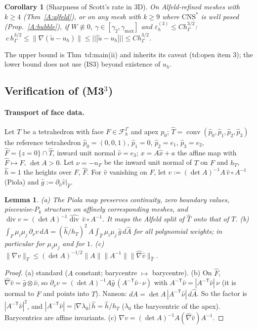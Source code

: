 \documentclass[11pt]{article}
\newtheorem{lemma}[theorem]{Lemma}
\newtheorem{corollary}[theorem]{Corollary}
\theoremstyle{definition}
\newcommand{\hG}{h_\Gamma}
\newcommand{\FG}{\mathcal F_h^\Gamma}
\newcommand{\ut}{\tilde u}
\newcommand{\tnorm}[1]{|\!|\!|#1|\!|\!|}
\newcommand{\norm}[1]{\lVert #1\rVert}
\newcommand{\CNS}{\mathrm{CNS}^\ast}
\renewcommand{\div}{\operatorname{div}}
\begin{document}
\begin{corollary}[Sharpness of Scott's rate in 3D]\label{A:sharp}
On Alfeld-refined meshes with $k\ge4$ (Thm~\ref{A:alfeld}), or on any mesh with $k\ge9$ where $\CNS$ is well posed (Prop.~\ref{A:bubble}), if $W\not\equiv0$, $\gamma\in[\gamma_2,\gamma_{\max}]$ and $\varepsilon_h^{(3)}\le C\hG^{3/2}$:
$\ c\,\hG^{3/2}\le\norm{\nabla(\ut-u_h)}\le\tnorm{\ut-u_h}\le C\hG^{3/2}$.
\end{corollary}
The upper bound is Thm~td:main(ii) and inherits its caveat (td:open item 3); the lower bound does not use (IS3) beyond existence of $u_h$.

\subsection{Verification of (M3$^3$)}\label{A:ver}

\paragraph{Transport of face data.} Let $T$ be a tetrahedron with face $F\in\FG$ and apex $p_0$; $\hat T=\operatorname{conv}(\hat p_0,\hat p_1,\hat p_2,\hat p_3)$ the reference tetrahedron $\hat p_0=(0,0,1)$, $\hat p_1=0$, $\hat p_2=e_1$, $\hat p_3=e_2$, $\hat F=\{z=0\}\cap\hat T$, inward unit normal $\hat\nu=e_3$; $x=A\hat x+a$ the affine map with $\hat F\mapsto F$, $\det A>0$. Let $\nu=-n_F$ be the inward unit normal of $T$ on $F$ and $h_T$, $\hat h=1$ the heights over $F$, $\hat F$. For $\hat v$ vanishing on $\hat F$, let $v:=(\det A)^{-1}A\,\hat v\circ A^{-1}$ (Piola) and $\hat g:=\partial_{\hat\nu}\hat v|_{\hat F}$.

\begin{lemma}\label{A:piola}
(a) The Piola map preserves continuity, zero boundary values, piecewise-$P_k$ structure on affinely corresponding meshes, and $\div v=(\det A)^{-1}\widehat{\div}\,\hat v\circ A^{-1}$. It maps the Alfeld split of $\hat T$ onto that of $T$.
(b) $\int_F\mu_i\mu_j\,\partial_\nu v\,dA=(\hat h/h_T)^2\,A\int_{\hat F}\mu_i\mu_j\,\hat g\,d\hat A$ for all polynomial weights; in particular for $\mu_i\mu_j$ and for $1$.
(c) $\norm{\nabla v}_T\le(\det A)^{-1/2}\norm A\norm{A^{-1}}\norm{\hat\nabla\hat v}_{\hat T}$.
\end{lemma}
\begin{proof}
(a) standard ($A$ constant; barycentre $\mapsto$ barycentre). (b) On $\hat F$, $\hat\nabla\hat v=\hat g\otimes\hat\nu$, so $\partial_\nu v=(\det A)^{-1}A\hat g\,(A^{-\mathsf T}\hat\nu\cdot\nu)$ with $A^{-\mathsf T}\hat\nu=|A^{-\mathsf T}\hat\nu|\,\nu$ (it is normal to $F$ and points into $T$). Nanson: $dA=\det A\,|A^{-\mathsf T}\hat\nu|\,d\hat A$. So the factor is $|A^{-\mathsf T}\hat\nu|^2$, and $|A^{-\mathsf T}\hat\nu|=|\nabla\lambda_0|\,\hat h=\hat h/h_T$ ($\lambda_0$ the barycentric of the apex). Barycentrics are affine invariants. (c) $\nabla v=(\det A)^{-1}A(\hat\nabla\hat v)A^{-1}$.
\end{proof}
\end{document}
